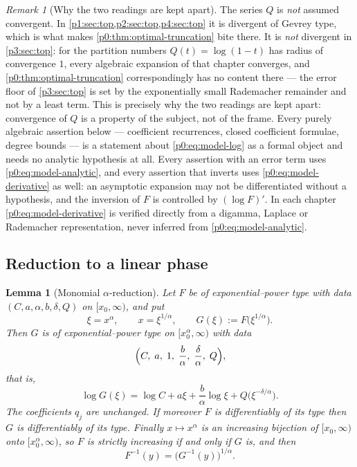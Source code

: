 \documentclass[11pt,a4paper,oneside]{book}
\theoremstyle{plain}
\newtheorem{lemma}[theorem]{Lemma}
\theoremstyle{definition}
\theoremstyle{remark}
\newtheorem{remark}[theorem]{Remark}
\begin{document}
\begin{remark}[Why the two readings are kept apart]\label{p0:rem:formal-analytic}
The series $Q$ is \emph{not} assumed convergent.  In
\cref{p1:sec:top,p2:sec:top,p4:sec:top} it is divergent of Gevrey type, which
is what makes \cref{p0:thm:optimal-truncation} bite there.  It is \emph{not}
divergent in \cref{p3:sec:top}: for the partition numbers
$Q(t)=\log(1-t)$ has radius of convergence $1$, every algebraic expansion of
that chapter converges, and \cref{p0:thm:optimal-truncation} correspondingly
has no content there --- the error floor of \cref{p3:sec:top} is set by the
exponentially small Rademacher remainder and not by a least term.  This is
precisely why the two readings are kept apart: convergence of $Q$ is a
property of the subject, not of the frame.  Every purely algebraic assertion
below --- coefficient recurrences, closed coefficient formulae, degree bounds
--- is a statement about \eqref{p0:eq:model-log} as a formal object and needs
no analytic hypothesis at all.  Every assertion with an error term uses
\eqref{p0:eq:model-analytic}, and every assertion that inverts uses
\eqref{p0:eq:model-derivative} as well: an asymptotic expansion may not be
differentiated without a hypothesis, and the inversion of $F$ is controlled by
$(\log F)'$.  In each chapter \eqref{p0:eq:model-derivative} is verified
directly from a digamma, Laplace or Rademacher representation, never inferred
from \eqref{p0:eq:model-analytic}.
\end{remark}

\subsection{Reduction to a linear phase}

\begin{lemma}[Monomial $\alpha$-reduction]\label{p0:lem:alpha-reduction}
Let $F$ be of exponential--power type with data
$(C,a,\alpha,b,\delta,Q)$ on $[x_0,\infty)$, and put
\begin{equation}\label{p0:eq:alpha-substitution}
 \xi=x^{\alpha},\qquad x=\xi^{1/\alpha},\qquad
 G(\xi):=F\bigl(\xi^{1/\alpha}\bigr).
\end{equation}
Then $G$ is of exponential--power type on $[x_0^\alpha,\infty)$ with data
\begin{equation}\label{p0:eq:alpha-reduced-data}
 \Bigl(C,\;a,\;1,\;\frac b\alpha,\;\frac\delta\alpha,\;Q\Bigr),
\end{equation}
that is,
\begin{equation}\label{p0:eq:alpha-reduced-log}
 \log G(\xi)=\log C+a\xi+\frac b\alpha\log\xi
             +Q\bigl(\xi^{-\delta/\alpha}\bigr).
\end{equation}
The coefficients $q_j$ are unchanged.  If moreover $F$ is differentiably of
its type then $G$ is differentiably of its type.  Finally $x\mapsto x^\alpha$
is an increasing bijection of $[x_0,\infty)$ onto $[x_0^\alpha,\infty)$, so
$F$ is strictly increasing if and only if $G$ is, and then
\begin{equation}\label{p0:eq:alpha-inverse-transport}
 F^{-1}(y)=\bigl(G^{-1}(y)\bigr)^{1/\alpha}.
\end{equation}
\end{lemma}
\end{document}
